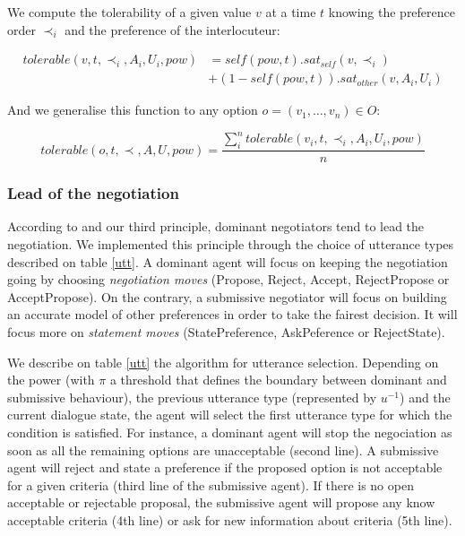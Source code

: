 \documentclass{llncs}
\begin{document}
	We compute the tolerability of a given value $v$ at a time $t$ knowing the preference order $\prec_i$ and the preference of the interlocuteur:
	
	\begin{equation}
	\begin{split}
	tolerable(v, t, \prec_i, A_i, U_i, pow) & = self(pow, t) . sat_{self}(v, \prec_i) \\
	& +  (1 - self(pow, t)) . sat_{other}(v, A_i, U_i)
	\end{split} 
	\end{equation}
	
	And we generalise this function to any option $o=(v_1,\ldots,v_n) \in O$:
	
	\begin{equation}
	tolerable(o, t, \prec, A, U, pow) = \frac{ \sum_{i}^{n} tolerable(v_i, t, \prec_i, A_i, U_i, pow) } {n}
	\end{equation}
	
	
	\subsubsection{Lead of the negotiation}
	According to \cite{ref} and our third principle, dominant negotiators tend to lead the negotiation. We implemented this principle through the choice of utterance types described on table \ref{utt}. A dominant agent will focus on keeping the negotiation going by choosing \emph{negotiation moves} (Propose, Reject, Accept, RejectPropose or AcceptPropose). On the contrary, a submissive negotiator will focus on building an accurate model of other preferences in order to take the fairest decision. It will focus more on \emph{statement moves} (StatePreference, AskPeference or RejectState).
	
	We describe on table \ref{utt} the algorithm for utterance selection. Depending on the power (with $\pi$ a threshold that defines the boundary between dominant and submissive behaviour), the previous utterance type (represented by $u^{-1}$) and the current dialogue state, the agent will select the first utterance type for which the condition is satisfied. For instance, a dominant agent will stop the negociation as soon as all the remaining options are unacceptable (second line). A submissive agent will reject and state a preference if the proposed option is not acceptable for a given criteria (third line of the submissive agent). If there is no open acceptable or rejectable proposal, the submissive agent will propose any know acceptable criteria (4th line) or ask for new information about criteria (5th line).
	
\end{document}
